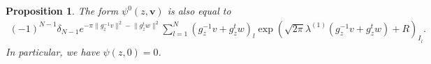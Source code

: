 \documentclass[a4paper,11pt]{amsart} %
\newcommand{\8}{\infty}
\newcommand{\vbf}{\mathbf{v}}
\theoremstyle{mytheoremstyle}
\newtheorem{prop}[thm]{Proposition}
\theoremstyle{remark}
\newtheorem{rmk}{Remark}[section]
\numberwithin{equation}{section}
\begin{document}
\begin{prop} \label{explicitpsi2}
The form $\psi^0(z,\vbf)$ is also equal to
\begin{align}
(-1)^{N-1}\delta_{N-1}e^{-\pi \lVert g_z^{-1}v\rVert^2-\lVert g_z^{t}w \rVert^2 } \sum_{l=1}^N (g_z^{-1}v+g_z^tw)_l \exp \left (\sqrt{2\pi} \lambda^{(1)}(g_z^{-1}v+g_z^tw)+R \right )_{I_{\widehat{l}}}.
\end{align}
In particular, we have $\psi(z,0)=0$.
\end{prop}
\end{document}
